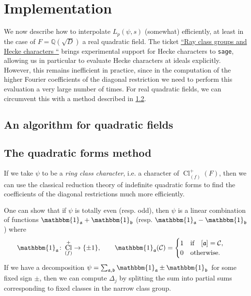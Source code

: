 \documentclass[11pt,a4paper]{article}
\let\mc\mathcal
\let\mf\mathfrak
\newcommand{\Q}{\mathbb{Q}}
\DeclareMathOperator{\Cl}{Cl}
\theoremstyle{plain}
\theoremstyle{definition}
\theoremstyle{remark}
\numberwithin{equation}{section}
\begin{document}
\section{Implementation}
\label{sec:implementation}
We now describe how to interpolate $L_{p}(\psi,s)$ (somewhat)
efficiently, at least in the case of $F = \Q(\sqrt{D})$ a real
quadratic field. The ticket
\href{https://trac.sagemath.org/ticket/15829}{``Ray class groups and
  Hecke characters ``} brings experimental support for Hecke
characters to \texttt{sage}, allowing us in particular to evaluate
Hecke characters at ideals explicitly. However, this remains
inefficient in practice, since in the computation of the higher
Fourier coefficients of the diagonal restriction we need to perform
this evaluation a very large number of times. For real quadratic
fields, we can circumvent this with a method described in \cref{sec:quadr-forms-meth}.
\subsection{An algorithm for quadratic fields}

\subsection{The quadratic forms method}
\label{sec:quadr-forms-meth}
If we take $\psi$ to be a \emph{ring class character}, i.e. a character
of $\Cl_{(f)}^{+}(F)$, then we can use the classical reduction theory
of indefinite quadratic forms to find the coefficients of the diagonal
restrictions much more efficiently. 

One can show that if $\psi$ is totally even (resp. odd), then $\psi$ is a
linear combination of functions $\mathbbm{1}_{\mf a} +
\mathbbm{1}_{\mf b}$ (resp. $\mathbbm{1}_{\mf a} -
\mathbbm{1}_{\mf b}$) where
\begin{equation}
  \label{eq:4}
  \mathbbm{1}_{\mf a} \colon \Cl_{(f)}^{+} \to \{\pm 1\}, \qq{}  \mathbbm{1}_{\mf a}(\mc C) = \begin{cases}
    1 \qq{if} [\mf a] = \mc C, \\
    0 \qq{otherwise.}
  \end{cases}
\end{equation}
If we have a decomposition $\psi = \sum_{\mf a,\mf b}\mathbbm{1}_{\mf
  a}\pm\mathbbm{1}_{\mf b}$ for some fixed sign $\pm$, then we can
compute $\Delta_{j}$ by splitting the sum into partial sums corresponding
to fixed classes in the narrow class group. 
\end{document}
